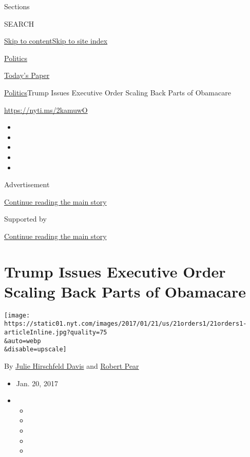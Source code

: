 Sections

SEARCH

\protect\hyperlink{site-content}{Skip to
content}\protect\hyperlink{site-index}{Skip to site index}

\href{https://www.nytimes.com/section/politics}{Politics}

\href{https://myaccount.nytimes.com/auth/login?response_type=cookie\&client_id=vi}{}

\href{https://www.nytimes.com/section/todayspaper}{Today's Paper}

\href{/section/politics}{Politics}\textbar{}Trump Issues Executive Order
Scaling Back Parts of Obamacare

\url{https://nyti.ms/2kamuwO}

\begin{itemize}
\item
\item
\item
\item
\item
\end{itemize}

Advertisement

\protect\hyperlink{after-top}{Continue reading the main story}

Supported by

\protect\hyperlink{after-sponsor}{Continue reading the main story}

\hypertarget{trump-issues-executive-order-scaling-back-parts-of-obamacare}{%
\section{Trump Issues Executive Order Scaling Back Parts of
Obamacare}\label{trump-issues-executive-order-scaling-back-parts-of-obamacare}}

\texttt{[image: https://static01.nyt.com/images/2017/01/21/us/21orders1/21orders1-articleInline.jpg?quality=75\\\&auto=webp\\\&disable=upscale]}

By \href{https://www.nytimes.com/by/julie-hirschfeld-davis}{Julie
Hirschfeld Davis} and
\href{https://www.nytimes.com/by/robert-pear}{Robert Pear}

\begin{itemize}
\item
  Jan. 20, 2017
\item
  \begin{itemize}
  \item
  \item
  \item
  \item
  \item
  \end{itemize}
\end{itemize}

